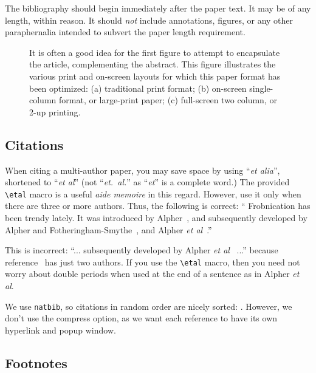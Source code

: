 \documentclass[extendedabs]{recpad2k}
\def\etal{\emph{et al}\bmvaOneDot}
\begin{document}
The bibliography should begin immediately after the paper text.  It may
be of any length, within reason.  It should {\em not} include
annotations, figures, or any other paraphernalia intended to subvert the
paper length requirement.

 \begin{figure*}
 \caption{It is often a good idea for the first figure to attempt to
 encapsulate the article, complementing the abstract.  This figure illustrates
 the various print and on-screen layouts for which this paper format has
 been optimized: (a) traditional print format; (b) on-screen
 single-column format, or large-print paper; (c) full-screen two column, or
 2-up printing. }
\label{fig:teaser}
\end{figure*}
  


 \subsection{Citations}
 When citing a multi-author paper, you may save space by using ``{\em et
 alia}'', shortened to ``\etal'' (not ``{\em et.\ al.}'' as ``{\em et}'' is
 a complete word.)  The provided \verb'\etal' macro is a useful {\em aide
 memoire} in this regard.  However, use it only when there are three or more
 authors.  Thus, the following is correct: `` Frobnication has been trendy
 lately.  It was introduced by Alpher~\cite{Alpher02}, and subsequently
 developed by Alpher and Fotheringham-Smythe~\cite{Alpher03}, and Alpher
 \etal~\cite{Alpher04}.''

 This is incorrect: ``... subsequently developed by Alpher \etal~\cite{Alpher03} ...''
 because reference~\cite{Alpher03} has just two authors.  If you use the
 \verb'\etal' macro, then you need not worry about double periods
 when used at the end of a sentence as in Alpher \etal.

 We use {\tt natbib}, so citations in random order are nicely sorted:
  \cite{Alpher03,Alpher02,Authors06b,Authors06}.  However, we don't use the
 compress option, as we want each reference to have its own hyperlink and
 popup window.

 \subsection{Footnotes}
\end{document}
